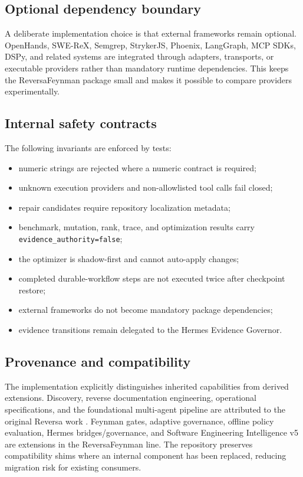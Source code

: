 \subsection{Optional dependency boundary}

A deliberate implementation choice is that external frameworks remain optional. OpenHands, SWE-ReX, Semgrep, StrykerJS, Phoenix, LangGraph, MCP SDKs, DSPy, and related systems are integrated through adapters, transports, or executable providers rather than mandatory runtime dependencies. This keeps the ReversaFeynman package small and makes it possible to compare providers experimentally.

\subsection{Internal safety contracts}

The following invariants are enforced by tests:

\begin{itemize}
  \item numeric strings are rejected where a numeric contract is required;
  \item unknown execution providers and non-allowlisted tool calls fail closed;
  \item repair candidates require repository localization metadata;
  \item benchmark, mutation, rank, trace, and optimization results carry \texttt{evidence\_authority=false};
  \item the optimizer is shadow-first and cannot auto-apply changes;
  \item completed durable-workflow steps are not executed twice after checkpoint restore;
  \item external frameworks do not become mandatory package dependencies;
  \item evidence transitions remain delegated to the Hermes Evidence Governor.
\end{itemize}

\subsection{Provenance and compatibility}

The implementation explicitly distinguishes inherited capabilities from derived extensions. Discovery, reverse documentation engineering, operational specifications, and the foundational multi-agent pipeline are attributed to the original Reversa work \cite{macedo2026reversa}. Feynman gates, adaptive governance, offline policy evaluation, Hermes bridges/governance, and Software Engineering Intelligence v5 are extensions in the ReversaFeynman line. The repository preserves compatibility shims where an internal component has been replaced, reducing migration risk for existing consumers.